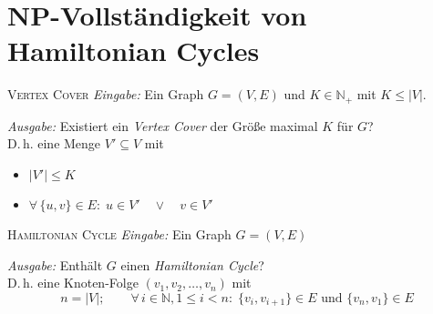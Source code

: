 \documentclass[a4paper,14pt]{scrartcl}
\newcommand{\VC}{\textsc{Vertex Cover}}
\newcommand{\HC}{\textsc{Hamiltonian Cycle}}
\begin{document}
\section*{NP-Vollständigkeit von Hamiltonian Cycles}

\begin{definition}{\VC{}}
    \emph{Eingabe:} Ein Graph $G = (V,E)$ und $K \in \mathbb{N}_+$ mit $K \leq |V|$.

    \emph{Ausgabe:} Existiert ein \emph{Vertex Cover} der Größe maximal $K$ für $G$?  \\
    D.\,h. eine Menge $V'\subseteq V$ mit
    \begin{minipage}[t]{\linewidth}
        \begin{itemize}
            \item $|V'| \leq K$
            \item $\displaystyle
                \forall \, \{u,v\} \in E: \; u \in V' \quad \lor \quad v \in V'
                $
        \end{itemize}
    \end{minipage}
\end{definition}

\vfill

\begin{definition}{\HC{}}
    \emph{Eingabe:} Ein Graph $G = (V,E)$

    \emph{Ausgabe:} Enthält $G$ einen \emph{Hamiltonian Cycle}?  \\
    D.\,h. eine Knoten-Folge $(v_1,v_2,\dots,v_n)$ mit
    \[
        n = |V|; \qquad
        \forall \, i \in \mathbb{N}, 1\leq i < n: \; \{v_i,v_{i+1}\} \in E \text{ und } \{v_n,v_1\} \in E
    \]
\end{definition}

\vfill
\end{document}
